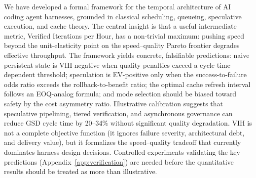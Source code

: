 \documentclass[11pt, a4paper, logo, copyright]{googledeepmind}
\begin{document}
We have developed a formal framework for the temporal architecture of AI coding agent harnesses, grounded in classical scheduling, queueing, speculative execution, and cache theory. The central insight is that a useful intermediate metric, Verified Iterations per Hour, has a non-trivial maximum: pushing speed beyond the unit-elasticity point on the speed--quality Pareto frontier degrades effective throughput. The framework yields concrete, falsifiable predictions: naive persistent state is VIH-negative when quality penalties exceed a cycle-time-dependent threshold; speculation is EV-positive only when the success-to-failure odds ratio exceeds the rollback-to-benefit ratio; the optimal cache refresh interval follows an EOQ-analog formula; and mode selection should be biased toward safety by the cost asymmetry ratio. Illustrative calibration suggests that speculative pipelining, tiered verification, and asynchronous governance can reduce GSD cycle time by 20--34\% without significant quality degradation. VIH is not a complete objective function (it ignores failure severity, architectural debt, and delivery value), but it formalizes the speed--quality tradeoff that currently dominates harness design decisions. Controlled experiments validating the key predictions (Appendix~\ref{app:verification}) are needed before the quantitative results should be treated as more than illustrative.
\end{document}
